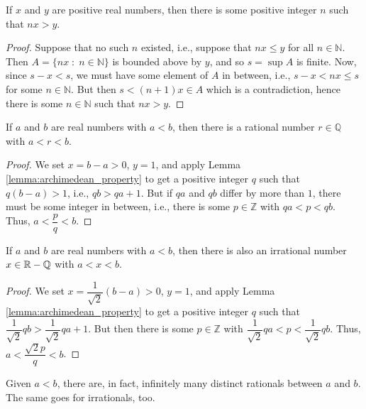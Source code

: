 \documentclass[11pt,a4paper]{article}
\begin{document}
\begin{lemma}\label{lemma:archimedean_property}
    If $x$ and $y$ are positive real numbers, then there is some positive integer $n$ such that $nx>y$.
\end{lemma}

\begin{proof}
    Suppose that no such $n$ existed, i.e., suppose that $nx\le y$ for all $n\in \mathbb{N}$. Then $A = \{nx\;:\;n\in \mathbb{N}\}$ is bounded above by $y$, and so $s = \sup A$ is finite. Now, since $s-x<s$, we must have some element of $A$ in between, i.e., $s-x<nx\le s$ for some $n\in \mathbb{N}$. But then $s<(n+1)x\in A$ which is a contradiction, hence there is some $n\in\mathbb{N}$ such that $nx>y$.
\end{proof}

\begin{theorem}
    If $a$ and $b$ are real numbers with $a<b$, then there is a rational number $r\in \mathbb{Q}$ with $a<r<b$.
\end{theorem}

\begin{proof}
    We set $x = b-a>0$, $y = 1$, and apply Lemma \ref{lemma:archimedean_property} to get a positive integer $q$ such that $q(b-a)>1$, i.e., $qb>qa+1$. But if $qa$ and $qb$ differ by more than $1$, there must be some integer in between, i.e., there is some $p\in \mathbb{Z}$  with $qa<p<qb$. Thus, $a<\dfrac{p}{q}<b$.
\end{proof}

\begin{corollary}
    If $a$ and $b$ are real numbers with $a<b$, then there is also an irrational number $x\in \mathbb{R}-\mathbb{Q}$ with $a<x<b$.
\end{corollary}

\begin{proof}
    We set $x = \dfrac{1}{\sqrt{2}}(b-a)>0$, $y = 1$, and apply Lemma \ref{lemma:archimedean_property} to get a positive integer $q$ such that $\dfrac{1}{\sqrt{2}}qb>\dfrac{1}{\sqrt{2}}qa+1$. But then there is some $p\in \mathbb{Z}$  with $\dfrac{1}{\sqrt{2}}qa<p<\dfrac{1}{\sqrt{2}}qb$. Thus, $a<\dfrac{\sqrt{2}p}{q}<b$.
\end{proof}

\begin{corollary}
    Given $a<b$, there are, in fact, infinitely many distinct rationals between $a$ and $b$. The same goes for irrationals, too.
\end{corollary}
\end{document}
